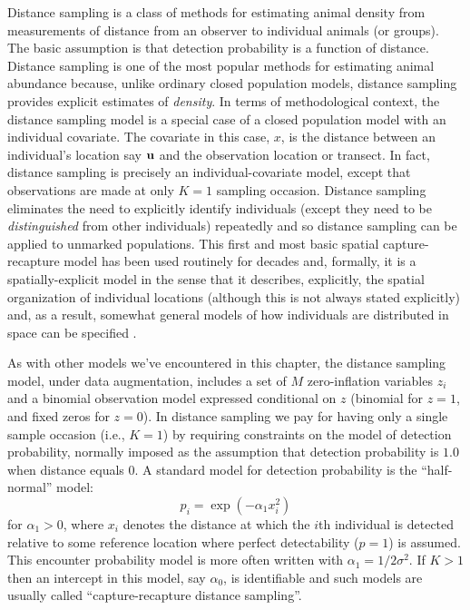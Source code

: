 Distance sampling is a class of methods for estimating animal density
from measurements of distance from an observer to individual animals
(or groups). The basic assumption is that detection probability is
 a function of distance.
Distance sampling is one of the most popular methods for estimating
animal abundance \citep{burnham_etal:1980, buckland_etal:2001,
  buckland_etal:2004book} because, unlike ordinary closed population models,
distance sampling provides explicit estimates of {\it density}.
 In terms of
methodological context, the distance sampling model is a special case
of a closed population model with an individual covariate. The
covariate in this case, $x$, is the distance between an
individual's location say ${\bf u}$ and the observation location or transect. In
fact, distance sampling is precisely an
individual-covariate model,  except
that observations are made at only $K=1$ sampling occasion. 
Distance sampling  eliminates the need to
explicitly identify individuals (except they need to be {\it
  distinguished} from other individuals) repeatedly and so distance
sampling can be applied to unmarked populations.
This first and most basic spatial
capture-recapture model has been used routinely for decades and,
formally, it is a spatially-explicit model in the sense that it
describes, explicitly, the spatial organization of individual
locations (although this is not always stated explicitly) and, as a
result, somewhat general models of how individuals are distributed in
space can be specified \citep{hedley_etal:1999, royle_etal:2004,
  johnson_etal:2010, niemi_fernandez:2010, sillett_etal:2012}.


As with other models we've encountered in this chapter, the distance sampling model, under data augmentation,
includes a set of $M$ zero-inflation variables $z_{i}$ and a
binomial observation model expressed conditional on $z$ (binomial for $z=1$, and
fixed zeros for $z=0$).  In distance sampling we pay for having only a
single sample occasion (i.e., $K=1$) by requiring constraints on the model of
detection probability, normally imposed as the assumption that
detection probability is $1.0$ when distance equals 0.  A standard
model for detection probability is the ``half-normal'' model:
\[
p_{i} = \exp(-\alpha_{1} x_{i}^{2})
\]
for $\alpha_{1} > 0$, 
where $x_i$ denotes the distance at which the $i$th
individual is detected relative to some reference location where
perfect detectability ($p=1$) is assumed. This encounter probability
model is more often written with
$\alpha_{1} =
1/2\sigma^{2}$.  If $K>1$ then an intercept in this model, say $\alpha_{0}$, is
identifiable and such models are usually called ``capture-recapture
distance sampling''\citep{alpizar_pollock:1996,borchers_etal:1998}.

